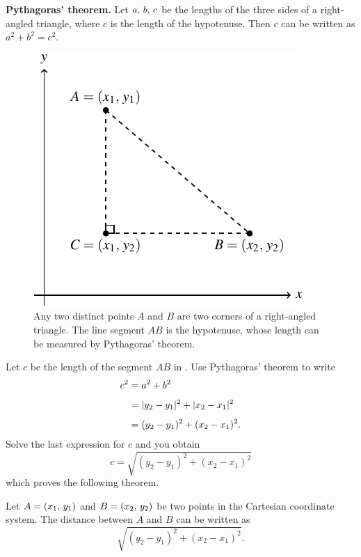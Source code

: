 \documentclass[a4paper,oneside,12pt]{article}
\begin{document}
\begin{theorem}
\textbf{Pythagoras' theorem.}
Let ${a},\, {b},\, {c}$ be the lengths of the three sides of a
right-angled triangle, where $c$ is the length of the hypotenuse.
Then $c$ can be written as $a^2 + b^2 = c^2$.
\end{theorem}

\begin{figure}[!htbp]
\centering
\includegraphics[scale=1.1]{image/03/distance-two-points.pdf}
\caption{%
  Any two distinct points $A$ and $B$ are two corners of a
  right-angled triangle.  The line segment $AB$ is the hypotenuse,
  whose length can be measured by Pythagoras' theorem.
}
\label{fig:distance_between_two_points}
\end{figure}

Let $c$ be the length of the segment $AB$ in
.  Use Pythagoras' theorem to
write
\begin{align*}
c^2
&=
a^2 + b^2 \\[4pt]
&=
\lvert y_2 - y_1\rvert^2 + \lvert x_2 - x_1\rvert^2 \\[4pt]
&=
(y_2 - y_1)^2 + (x_2 - x_1)^2.
\end{align*}
Solve the last expression for $c$ and you obtain
\[
c
=
\sqrt{
  (y_2 - y_1)^2
  +
  (x_2 - x_1)^2
}
\]
which proves the following theorem.

\begin{theorem}
\label{thm:distance_between_two_points}
Let $A = \left\lparen{x_1},\, {y_1}\right\rparen$ and $B = \left\lparen{x_2},\, {y_2}\right\rparen$ be two points in
the Cartesian coordinate system.  The distance between $A$ and $B$ can
be written as
\[
\sqrt{
  (y_2 - y_1)^2
  +
  (x_2 - x_1)^2
}.
\]
\end{theorem}
\end{document}
